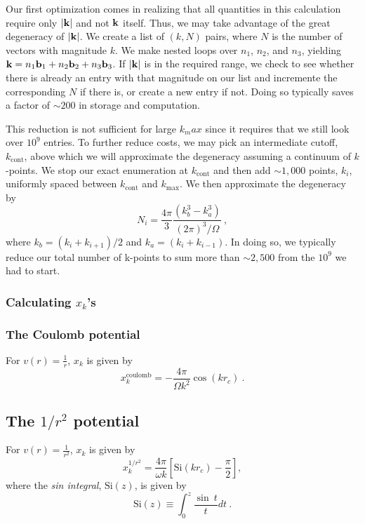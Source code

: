 Our first optimization comes in realizing that all quantities in this
calculation require only $|\mathbf{k}|$ and not $\mathbf{k}$ itself.  Thus, we may
take advantage of the great degeneracy of $|\mathbf{k}|$.  We create a list
of $(k,N)$ pairs, where $N$ is the number of vectors with magnitude $k$.
We make nested loops over
$n_1$, $n_2$, and $n_3$, yielding $\mathbf{k} = n_1 \mathbf{b}_1 + n_2 \mathbf{b}_2 + n_3
\mathbf{b}_3$. If $|\mathbf{k}|$ is in the required range, we check to see whether there
is already an entry with that magnitude on our list and incremente the
corresponding $N$ if there is, or create a new entry if not.  Doing
so typically saves a factor of $\sim200$ in storage and computation.

This reduction is not sufficient for large $k_max$ since it
requires that we still look over $10^9$ entries.  To further reduce
costs, we may pick an intermediate cutoff, $k_{\text{cont}}$, above which
we will approximate the degeneracy assuming a continuum of
$k$-points.  We stop our exact enumeration at $k_{\text{cont}}$ and
then add $\sim1,000$ points, $k_i$, uniformly spaced between $k_{\text{cont}}$
and $k_{\text{max}}$. We then approximate the degeneracy by
\begin{equation}
N_i = \frac{4 \pi}{3} \frac{\left( k_b^3 -k_a^3\right)}{(2\pi)^3/\Omega}\:,
\end{equation}
where $k_b = (k_i + k_{i+1})/2$ and $k_a = (k_i + k_{i-1})$.  In doing
so, we typically reduce our total number of k-points to sum more than $\sim2,500$ from the $10^9$ we had to start.

\subsubsection{Calculating $x_k$'s}
\subsubsection*{The Coulomb potential}
For $v(r) = \frac{1}{r}$, $x_k$ is given by
\begin{equation}
x_k^{\text{coulomb}} = -\frac{4 \pi}{\Omega k^2} \cos(k r_c)\:.
\end{equation}

\subsection*{The $1/r^2$ potential}
For $v(r) = \frac{1}{r^2}$, $x_k$ is given by
\begin{equation}
x_k^{1/r^2} = \frac{4 \pi}{\omega k} 
\left[ \text{Si}(k r_c) -\frac{\pi}{2}\right],
\end{equation}
where the {\em sin integral}\:, $\text{Si}(z)$, is given by
\begin{equation}
\text{Si}(z) \equiv \int_0^z \frac{\sin \ t}{t} dt\:.
\end{equation}

